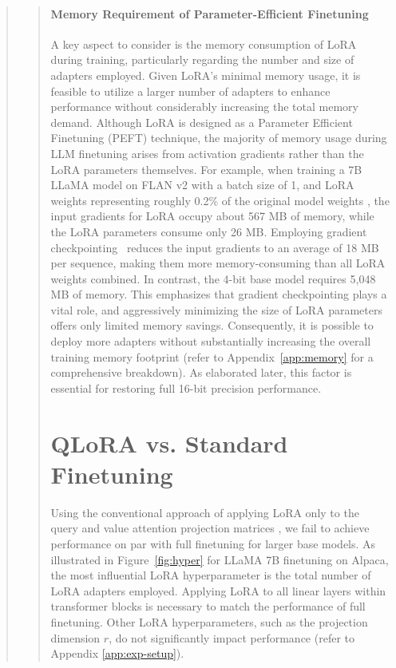 \begin{quote}
\begin{quote}
\paragraph{Memory Requirement of Parameter-Efficient Finetuning} A key aspect to consider is the memory consumption of LoRA during training, particularly regarding the number and size of adapters employed. Given LoRA's minimal memory usage, it is feasible to utilize a larger number of adapters to enhance performance without considerably increasing the total memory demand. Although LoRA is designed as a Parameter Efficient Finetuning (PEFT) technique, the majority of memory usage during LLM finetuning arises from activation gradients rather than the LoRA parameters themselves. For example, when training a 7B LLaMA model on FLAN v2 with a batch size of 1, and LoRA weights representing roughly 0.2\% of the original model weights \citep{hu2021lora,liu2022few}, the input gradients for LoRA occupy about 567 MB of memory, while the LoRA parameters consume only 26 MB. Employing gradient checkpointing~\citep{chen2016training} reduces the input gradients to an average of 18 MB per sequence, making them more memory-consuming than all LoRA weights combined. In contrast, the 4-bit base model requires 5,048 MB of memory. This emphasizes that gradient checkpointing plays a vital role, and aggressively minimizing the size of LoRA parameters offers only limited memory savings. Consequently, it is possible to deploy more adapters without substantially increasing the overall training memory footprint (refer to Appendix~\ref{app:memory} for a comprehensive breakdown). As elaborated later, this factor is essential for restoring full 16-bit precision performance.

\section{QLoRA vs. Standard Finetuning}
\label{sec:comp_to_std}

Using the conventional approach of applying LoRA only to the query and value attention projection matrices \citep{hu2021lora}, we fail to achieve performance on par with full finetuning for larger base models. As illustrated in Figure~\ref{fig:hyper} for LLaMA 7B finetuning on Alpaca, the most influential LoRA hyperparameter is the total number of LoRA adapters employed. Applying LoRA to all linear layers within transformer blocks is necessary to match the performance of full finetuning. Other LoRA hyperparameters, such as the projection dimension $r$, do not significantly impact performance (refer to Appendix \ref{app:exp-setup}).


\end{quote}
\end{quote}
